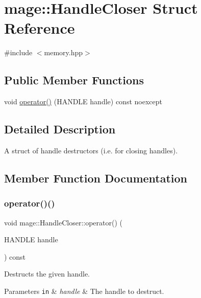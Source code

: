 \hypertarget{structmage_1_1_handle_closer}{}\section{mage\+:\+:Handle\+Closer Struct Reference}
\label{structmage_1_1_handle_closer}


{\ttfamily \#include $<$memory.\+hpp$>$}

\subsection*{Public Member Functions}
\begin{DoxyCompactItemize}
\item 
void \hyperlink{structmage_1_1_handle_closer_a5fb69ac519eb5ec7a2439fc12d46d075}{operator()} (H\+A\+N\+D\+LE handle) const noexcept
\end{DoxyCompactItemize}


\subsection{Detailed Description}
A struct of handle destructors (i.\+e. for closing handles). 

\subsection{Member Function Documentation}
\hypertarget{structmage_1_1_handle_closer_a5fb69ac519eb5ec7a2439fc12d46d075}{}\label{structmage_1_1_handle_closer_a5fb69ac519eb5ec7a2439fc12d46d075} 
\subsubsection{\texorpdfstring{operator()()}{operator()()}}
{\footnotesize\ttfamily void mage\+::\+Handle\+Closer\+::operator() (\begin{DoxyParamCaption}\item[{H\+A\+N\+D\+LE}]{handle }\end{DoxyParamCaption}) const\hspace{0.3cm}{\ttfamily [noexcept]}}

Destructs the given handle.


\begin{DoxyParams}[1]{Parameters}
\mbox{\tt in}  & {\em handle} & The handle to destruct. \\
\hline
\end{DoxyParams}
